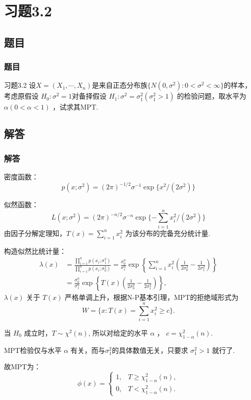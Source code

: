 \section{习题3.2}
\subsection{题目}
\begin{frame}
    \frametitle{题目}
    \begin{example}{习题3.2}
        设$ X=\left(X_{1}, \cdots, X_{n}\right) $是来自正态分布族$ \{N(0, \sigma^{2}): 0<\sigma^{2}<\infty\} $的样本，考虑原假设 $H_{0}: \sigma^{2}=1 $对备择假设 $H_{1}: \sigma^{2}=\sigma_{1}^{2}(\sigma_{1}^{2}>1)$ 的检验问题，取水平为 $\alpha(0<\alpha<1)$ ，试求其MPT.
    \end{example}
\end{frame}
\subsection{解答}
\begin{frame}[t,allowframebreaks]
    \frametitle{解答}
    密度函数： 
    \[
        p(x;\sigma^2)=(2\pi)^{-1/2}\sigma^{-1} \exp\{ {x^2}/{(2\sigma^2)} \}
    \]

    似然函数：
    \[
        L(x;\sigma^2)=(2\pi)^{-n/2}\sigma^{-n}\exp\{ -\sum_{i=1}^{n}{x_i^2}/{(2\sigma^2)} \}
    \]
    由因子分解定理知，$ T(x)=\sum_{i=1}^{n} x_{i}^{2}$ 为该分布的完备充分统计量.

    构造似然比统计量： 
    \[
        \begin{aligned} \lambda(x)&=\frac{\prod_{i=1}^{n} p\left(x_{i} ; \sigma_{1}^{2}\right)}{\prod_{i=1}^{n} p\left(x_{i} ; \sigma_{0}^{2}\right)}=\frac{\sigma_{0}^{n}}{\sigma_{1}^{n}} \exp \left\{ \sum_{i=1}^{n} x_{i}^{2}\left(\frac{1}{2 \sigma_{0}^{2}}-\frac{1}{2 \sigma_{1}^{2}}\right) \right\} \\ &=\frac{\sigma_{0}^{n}}{\sigma_{1}^{n}} \exp \left\{ T(x)\left(\frac{1}{2 \sigma_{0}^{2}}-\frac{1}{2 \sigma_{1}^{2}}\right) \right\}, \end{aligned}
    \]
    $\lambda(x)$ 关于 $T(x)$ 严格单调上升，根据N-P基本引理，MPT的拒绝域形式为 \[
        W=\{x: T(x)=\sum_{i=1}^{n} x_{i}^{2} \geqslant c\}.
    \]

    当 $H_{0}$ 成立时，$ T \sim \chi^{2}(n) $, 所以对给定的水平 $\alpha$ ， $c=\chi_{1-\alpha}^{2}(n) .$

    MPT检验仅与水平 $\alpha$ 有关，而与$ \sigma_{1}^2 $的具体数值无关，只要求 $\sigma_{1}^2>1$ 就行了.

    故MPT为： 
    \[
        \phi(x)=\left\{\begin{array}{ll} 1, & T \geqslant \chi_{1-\alpha}^{2}(n), \\ 0, & T<\chi_{1-\alpha}^{2}(n). \end{array}\right.
    \]
\end{frame}